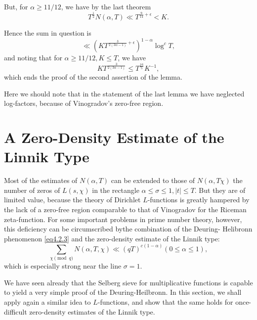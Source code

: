 But, for $\alpha \geq 11/12$, we have by the last theorem
$$
T^{\frac{1}{2}} N (\alpha,  T) \ll T^{\frac{9}{14}+ \epsilon }< K.
$$

Hence the sum in question is
$$
\ll \left(K T^{\frac{3}{2(3 \alpha -1)}+ \epsilon }\right)^{1-
  \alpha} \log^c T, 
$$
and noting that for $\alpha \geq 11/12,  K \leq T$, we have
$$
KT^{\frac{3}{2(3\alpha -1)}} \leq T^{\frac{16}{5}} K^{-1},
$$
which ends the proof of the second assertion of the lemma.

Here we should note that in the statement of the last lemma we have
neglected log-factors, because of Vinogradov's zero-free region. 

\section{A Zero-Density Estimate of the Linnik
  Type}\label{chap5-sec5.2}%

Most of the estimates of $N(\alpha,  T)$ can be extended to those of
$N(\alpha, T \chi)$ the number of zeros of $L (s, \chi)$ in the
rectangle $\alpha \leq \sigma \leq 1, |t| \leq T$. But they are of
limited value, because the theory of Dirichlet $L$-functions is greatly
hampered by the lack of a zero-free region comparable to that of
Vinogradov for the Riceman zeta-function. For some important problems
in prime number theory, however, this deficiency can be circumscribed
by\pageoriginale the combination of the Deuring- Helibronn  phenomenon
\eqref{eq4.2.3} and the zero-density estimate of the Linnik type: 
\begin{equation*}
  \sum_{\chi\pmod{q}} N(\alpha, T,  \chi ) \ll (qT)^{c (1-\alpha)} (0
  \leq \alpha \leq 1), \tag{5.2.1} \label{eq5.2.1}
\end{equation*}
which is especially strong near the line $\sigma = 1$.

We have seen already that the Selberg sieve for multiplicative
functions is capable to yield a very simple proof of the
Deuring-Heilbronn. In this section, we shall apply again a similar
idea to $L$-functions, and show that the same holds for once-difficult
zero-density estimates of the Linnik type. 

